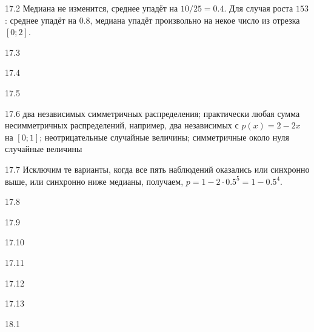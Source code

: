 \protect \hypertarget {soln:17.2}{}
\begin{solution}{{17.2}}
Медиана не изменится, среднее упадёт на $10/25=0.4$. Для случая роста $153$: среднее упадёт на $0.8$, медиана упадёт произвольно на некое число из отрезка $[0;2]$.
\end{solution}
\protect \hypertarget {soln:17.3}{}
\begin{solution}{{17.3}}
\end{solution}
\protect \hypertarget {soln:17.4}{}
\begin{solution}{{17.4}}
\end{solution}
\protect \hypertarget {soln:17.5}{}
\begin{solution}{{17.5}}
\end{solution}
\protect \hypertarget {soln:17.6}{}
\begin{solution}{{17.6}}
  два независимых симметричных распределения; практически любая сумма несимметричных распределений, например, два независимых с $p(x)=2-2x$ на $[0;1]$; неотрицательные случайные величины; симметричные около нуля случайные величины
\end{solution}
\protect \hypertarget {soln:17.7}{}
\begin{solution}{{17.7}}
  Исключим те варианты, когда все пять наблюдений оказались или синхронно выше, или синхронно ниже медианы, получаем, $p=1-2\cdot 0.5^5=1-0.5^4$.
\end{solution}
\protect \hypertarget {soln:17.8}{}
\begin{solution}{{17.8}}
\end{solution}
\protect \hypertarget {soln:17.9}{}
\begin{solution}{{17.9}}
\end{solution}
\protect \hypertarget {soln:17.10}{}
\begin{solution}{{17.10}}
\end{solution}
\protect \hypertarget {soln:17.11}{}
\begin{solution}{{17.11}}
\end{solution}
\protect \hypertarget {soln:17.12}{}
\begin{solution}{{17.12}}
\end{solution}
\protect \hypertarget {soln:17.13}{}
\begin{solution}{{17.13}}
\end{solution}
\protect \hypertarget {soln:18.1}{}
\begin{solution}{{18.1}}
\end{solution}
\protect \hypertarget {soln:18.2}{}
